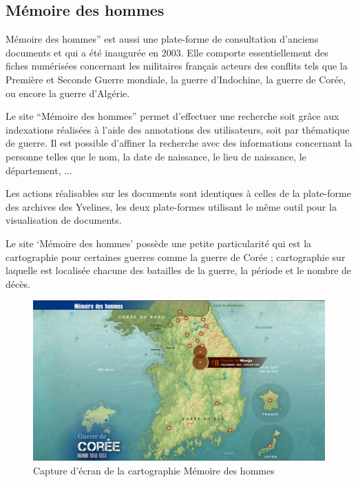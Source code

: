         \subsection{Mémoire des hommes}
        \label{subsec:memoire}
        Mémoire des hommes” est aussi une plate-forme de consultation d’anciens documents
        et qui a été inaugurée en 2003. Elle comporte essentiellement des fiches numérisées concernant
        les militaires français acteurs des conflits tels que la Première et Seconde Guerre mondiale,
        la guerre d’Indochine, la guerre de Corée, ou encore la guerre d’Algérie.

        Le site “Mémoire des hommes” permet d’effectuer une recherche soit grâce aux indexations
        réalisées à l’aide des annotations des utilisateurs, soit par thématique de guerre.
        Il est possible d’affiner la recherche avec des informations concernant la personne telles que le nom,
        la date de naissance, le lieu de naissance, le département, ...

        Les actions réalisables sur les documents sont identiques à celles de la plate-forme
        des archives des Yvelines, les deux plate-formes utilisant le même outil pour la visualisation
        de documents.

        Le site ‘Mémoire des hommes’ possède une petite particularité qui est la cartographie pour
        certaines guerres comme la guerre de Corée ; cartographie sur laquelle est localisée chacune
        des batailles de la guerre, la période et le nombre de décès.

        \begin{figure}[H]
            \centering
            \includegraphics[width=1\textwidth]{figure/screen_memoire_hommes.png}
            \caption{Capture d'écran de la cartographie Mémoire des hommes}
            \label{fig:memoire_hommes}
        \end{figure}

